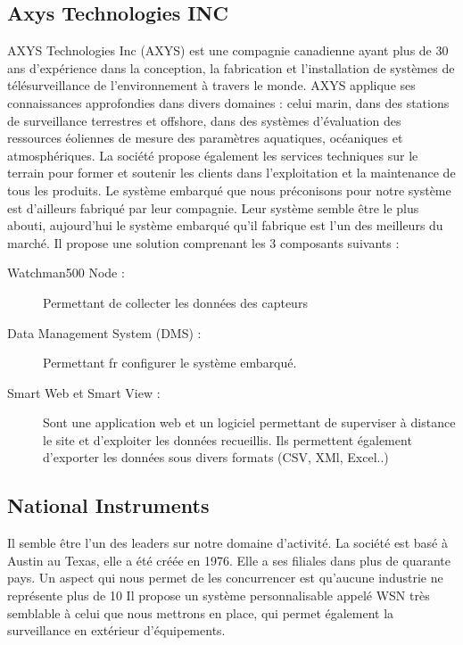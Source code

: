         \subsection{Axys Technologies INC}
        AXYS Technologies Inc (AXYS) est une compagnie canadienne ayant plus de 30 ans d'expérience dans la conception, la fabrication et l'installation de systèmes de télésurveillance de l'environnement à travers le monde. AXYS applique ses connaissances approfondies dans divers domaines : celui marin, dans des stations de surveillance terrestres et offshore, dans des systèmes d'évaluation des ressources éoliennes de mesure des paramètres aquatiques, océaniques et atmosphériques. La société propose également les services techniques sur le terrain pour former et soutenir les clients dans l'exploitation et la maintenance de tous les produits. Le système embarqué que nous préconisons pour notre système est d'ailleurs fabriqué par leur compagnie. Leur système semble être le plus abouti, aujourd'hui le système embarqué qu'il fabrique est l'un des meilleurs du marché. Il propose une solution comprenant les 3 composants suivants :
\begin{description}
           \item[Watchman500 Node :] Permettant de collecter les données des capteurs
           \item[Data Management System (DMS) :] Permettant fr configurer le système embarqué.
           \item[Smart Web et Smart View :] Sont une application web et un logiciel permettant de superviser à distance le site et d'exploiter les données recueillis. Ils permettent également d'exporter les données sous divers formats (CSV, XMl, Excel..)
\end{description}

        \subsection{National Instruments}
        Il semble être l'un des leaders sur notre domaine d'activité. La société est basé à Austin au Texas, elle a été créée en 1976. Elle a ses filiales dans plus de quarante pays. Un aspect qui nous permet de les concurrencer est qu'aucune industrie ne représente plus de 10%
        Il propose un système personnalisable appelé WSN très semblable à celui que nous mettrons en place, qui permet également la surveillance en extérieur d'équipements.



